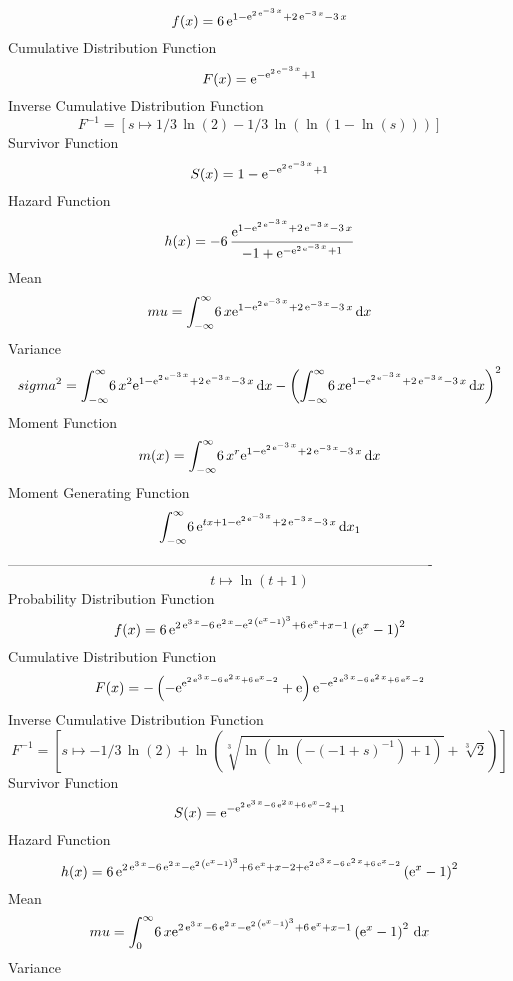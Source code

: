 \documentclass[12pt]{article}
\begin{document}
$$  f(x)=6\,{{\rm e}^{1-{{\rm e}^{2\,{{\rm e}^{-3\,x}}}}+2\,{{\rm e}^{-3\,x}}-3
\,x}}
$$Cumulative Distribution Function  
 $$F(x)={{\rm e}^{-{{\rm e}^{2\,{{\rm e}^{-3\,x}}}}+1}}
$$ Inverse Cumulative Distribution Function 
  $$F^{-1} = [s\mapsto 1/3\,\ln  \left( 2 \right) -1/3\,\ln  \left( \ln  \left( 1-
\ln  \left( s \right)  \right)  \right) ]
$$Survivor Function 
 $$ S(x)=1-{{\rm e}^{-{{\rm e}^{2\,{{\rm e}^{-3\,x}}}}+1}}
$$ Hazard Function 
 $$ h(x)=-6\,{\frac {{{\rm e}^{1-{{\rm e}^{2\,{{\rm e}^{-3\,x}}}}+2\,{{\rm e}^{
-3\,x}}-3\,x}}}{-1+{{\rm e}^{-{{\rm e}^{2\,{{\rm e}^{-3\,x}}}}+1}}}}
$$Mean 
 $$ mu=\int_{-\infty }^{\infty }\!6\,x{{\rm e}^{1-{{\rm e}^{2\,{{\rm e}^{-3\,
x}}}}+2\,{{\rm e}^{-3\,x}}-3\,x}}\,{\rm d}x
$$ Variance 
 $$ sigma^2 = \int_{-\infty }^{\infty }\!6\,{x}^{2}{{\rm e}^{1-{{\rm e}^{2\,{{\rm e}
^{-3\,x}}}}+2\,{{\rm e}^{-3\,x}}-3\,x}}\,{\rm d}x- \left( \int_{-
\infty }^{\infty }\!6\,x{{\rm e}^{1-{{\rm e}^{2\,{{\rm e}^{-3\,x}}}}+2
\,{{\rm e}^{-3\,x}}-3\,x}}\,{\rm d}x \right) ^{2}
$$Moment Function 
 $$ m(x) = \int_{-\infty }^{\infty }\!6\,{x}^{r}{{\rm e}^{1-{{\rm e}^{2\,{{\rm e}
^{-3\,x}}}}+2\,{{\rm e}^{-3\,x}}-3\,x}}\,{\rm d}x
$$ Moment Generating Function 
 $$\int_{-\infty }^{\infty }\!6\,{{\rm e}^{tx+1-{{\rm e}^{2\,{{\rm e}^{-3
\,x}}}}+2\,{{\rm e}^{-3\,x}}-3\,x}}\,{\rm d}x_{{1}}
$$-------------------------------------------------------------------------------------------  \\$$t\mapsto \ln  \left( t+1 \right) 
$$Probability Distribution Function 
$$  f(x)=6\,{{\rm e}^{2\,{{\rm e}^{3\,x}}-6\,{{\rm e}^{2\,x}}-{{\rm e}^{2\,
 \left( {{\rm e}^{x}}-1 \right) ^{3}}}+6\,{{\rm e}^{x}}+x-1}} \left( {
{\rm e}^{x}}-1 \right) ^{2}
$$Cumulative Distribution Function  
 $$F(x)=- \left( -{{\rm e}^{{{\rm e}^{2\,{{\rm e}^{3\,x}}-6\,{{\rm e}^{2\,x}}+
6\,{{\rm e}^{x}}-2}}}}+{\rm e} \right) {{\rm e}^{-{{\rm e}^{2\,{
{\rm e}^{3\,x}}-6\,{{\rm e}^{2\,x}}+6\,{{\rm e}^{x}}-2}}}}
$$ Inverse Cumulative Distribution Function 
  $$F^{-1} = [s\mapsto -1/3\,\ln  \left( 2 \right) +\ln  \left( \sqrt [3]{\ln 
 \left( \ln  \left( - \left( -1+s \right) ^{-1} \right) +1 \right) }+
\sqrt [3]{2} \right) ]
$$Survivor Function 
 $$ S(x)={{\rm e}^{-{{\rm e}^{2\,{{\rm e}^{3\,x}}-6\,{{\rm e}^{2\,x}}+6\,{
{\rm e}^{x}}-2}}+1}}
$$ Hazard Function 
 $$ h(x)=6\,{{\rm e}^{2\,{{\rm e}^{3\,x}}-6\,{{\rm e}^{2\,x}}-{{\rm e}^{2\,
 \left( {{\rm e}^{x}}-1 \right) ^{3}}}+6\,{{\rm e}^{x}}+x-2+{{\rm e}^{
2\,{{\rm e}^{3\,x}}-6\,{{\rm e}^{2\,x}}+6\,{{\rm e}^{x}}-2}}}} \left( 
{{\rm e}^{x}}-1 \right) ^{2}
$$Mean 
 $$ mu=\int_{0}^{\infty }\!6\,x{{\rm e}^{2\,{{\rm e}^{3\,x}}-6\,{{\rm e}^{2\,
x}}-{{\rm e}^{2\, \left( {{\rm e}^{x}}-1 \right) ^{3}}}+6\,{{\rm e}^{x
}}+x-1}} \left( {{\rm e}^{x}}-1 \right) ^{2}\,{\rm d}x
$$ Variance 
\end{document}
